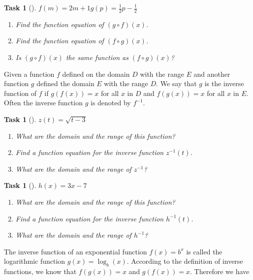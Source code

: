 \documentclass[10pt,]{article}
\theoremstyle{plain}
\newtheorem{proposition}[theorem]{Task}
\theoremstyle{definition}
\numberwithin{equation}{section}
\begin{document}
\begin{proposition}[{}]\label{proposition-23}
\(f(m)=2m+1\)\(g(p) = \frac{1}{2}p-\frac{1}{2}\)\leavevmode%
\begin{enumerate}
\item\hypertarget{li-145}{}Find the function equation of \((g \circ f)(x)\).%
\item\hypertarget{li-146}{}Find the function equation of \((f \circ g)(x)\).%
\item\hypertarget{li-147}{}Is \((g \circ f)(x)\) the same function as \((f \circ g)(x)\)?%
\end{enumerate}
\end{proposition}
\hypertarget{p-86}{}%
Given a function \(f\) defined on the domain \(D\) with the range \(E\) and another function \(g\) defined the domain \(E\) with the range \(D\). We say that \(g\) is the inverse function of \(f\) if \(g(f(x))=x\) for all \(x\) in \(D\) and \(f(g(x))=x\) for all \(x\) in \(E\). Often the inverse function \(g\) is denoted by \(f^{-1}\).%
\begin{proposition}[{}]\label{proposition-24}
\(z(t)=\sqrt{t-3}\)\leavevmode%
\begin{enumerate}
\item\hypertarget{li-148}{}What are the domain and the range of this function?%
\item\hypertarget{li-149}{}Find a function equation for the inverse function \(z^{-1}(t)\).%
\item\hypertarget{li-150}{}What are the domain and the range of \(z^{-1}\)?%
\end{enumerate}
\end{proposition}
\begin{proposition}[{}]\label{proposition-25}
\(h(x)=3x-7\)\leavevmode%
\begin{enumerate}
\item\hypertarget{li-151}{}What are the domain and the range of this function?%
\item\hypertarget{li-152}{}Find a function equation for the inverse function \(h^{-1}(t)\).%
\item\hypertarget{li-153}{}What are the domain and the range of \(h^{-1}\)?%
\end{enumerate}
\end{proposition}
\hypertarget{p-87}{}%
The inverse function of an exponential function \(f(x)=b^x\) is called the logarithmic function \(g(x)=\log_b(x)\). According to the definition of inverse functions, we know that \(f(g(x)) = x\) and \(g(f(x))=x\). Therefore we have%
\end{document}
